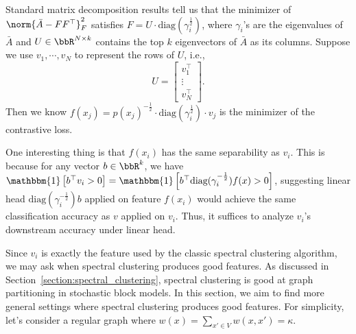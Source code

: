 Standard matrix decomposition results tell us that the minimizer of $\norm{\bar{A}-FF^\top}_F^2 $ satisfies $F = U \cdot \text{diag}(\gamma_i^{\frac{1}{2}})$, where $\gamma_i$'s are the eigenvalues of $\bar{A}$ and $U\in\bbR^{N\times k}$ contains the top $k$ eigenvectors of $\bar{A}$ as its columns. Suppose we use $v_1, \cdots, v_N$ to represent the rows of $U$, i.e., 
	\begin{equation}
	U = \begin{bmatrix}  v_1^\top  \\ \vdots \\  v_N^\top \end{bmatrix}.
\end{equation}
Then we know $f(x_j)= p(x_j)^{-\frac{1}{2}} \cdot \text{diag}(\gamma_i^{\frac{1}{2}}) \cdot v_j$ is the minimizer of the contrastive loss. 

\newcommand{\id}[1]{\mathbbm{1}\left[#1\right]}

One interesting thing is that $f(x_i)$ has the same separability as $v_i$. This is because for any vector $b\in\bbR^k$, we have $\id{b^\top v_i>0} = \id{b^\top \text{diag}(\gamma_i^{-\frac{1}{2}}) f(x) >0}$, suggesting linear head $\text{diag}(\gamma_i^{-\frac{1}{2}}) b$ applied on feature $f(x_i)$ would achieve the same classification accuracy as $v$ applied on $v_i$. Thus, it suffices to analyze $v_i$'s downstream accuracy under linear head.

Since $v_i$ is exactly the feature used by the classic spectral clustering algorithm, we may ask when spectral clustering produces good features. As discussed in Section~\ref{section:spectral_clustering}, spectral clustering is good at graph partitioning in stochastic block models. In this section, we aim to find more general settings where spectral clustering produces good features. For simplicity, let's consider a regular graph where $w(x) = \sum_{x'\in V} w(x, x') = \kappa$. 

